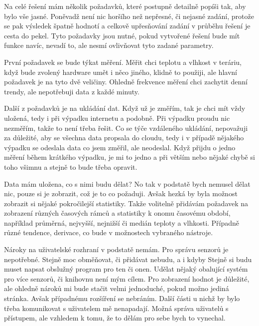 Na celé řešení mám několik požadavků, které postupně detailně popíši tak, aby bylo vše jasné. Poněvadž není nic horšího 
než nepřesné, či nejasné zadání, protože se pak výsledek špatně hodnotí a celkově upřesňování zadání v průběhu řešení je 
cesta do pekel. Tyto požadavky jsou nutné, pokud vytvořené řešení bude mít funkce navíc, nevadí to, ale nesmí ovlivňovat 
tyto zadané parametry.

První požadavek se bude týkat měření. Měřit chci teplotu a vlhkost v teráriu, když bude zvolený hardware umět i něco 
jiného, klidně to použiji, ale hlavní požadavek je na tyto dvě veličiny. Ohledně frekvence měření chci zachytit denní 
trendy, ale nepotřebuji data z každé minuty.

Další z požadavků je na ukládání dat. Když už je změřím, tak je chci mít vždy uložená, tedy i při výpadku internetu 
a podobně. Při výpadku proudu nic nezměřím, takže to není třeba řešit. Co se týče vzdáleného ukládání, nepovažuji za 
důležité, aby se všechna data propsala do cloudu, tedy i v případě nějakého výpadku se odeslala data co jsem změřil, ale 
neodeslal. Když přijdu o jedno měření během krátkého výpadku, je mi to jedno a při větším nebo nějaké chybě si toho 
všimnu a stejně to bude třeba opravit.

Data mám uložena, co s nimi budu dělat? No tak v podstatě bych nemusel dělat nic, pouze si je zobrazit, což je to co 
požaduji. Avšak hezká by byla možnost zobrazit si nějaké pokročilejší statistiky. Takže volitelně přidávám požadavek na 
zobrazení různých časových rámců a statistiky k onomu časovému období, například průměrná, nejvyšší, nejnižší či medián 
teploty a vlhkosti. Případně různé tendence, derivace, co bude v možnostech vybraného nástroje.

Nároky na uživatelské rozhraní v podstatě nemám. Pro správu senzorů je nepotřebné. Stejně moc obměňovat, či přidávat 
nebudu, a i kdyby Stejně si budu muset napsat obslužný program pro ten či onen. Udělat nějaký obalující systém pro více 
senzorů, či knihovnu není mým cílem. Pro zobrazení hodnot je důležité, ale ohledně nároků mi bude stačit velmi 
jednoduché, pokud možno jediná stránka. Avšak případnému rozšíření se nebráním. Další části u nichž by bylo třeba 
komunikovat s uživatelem mě nenapadají. Možná správa uživatelů s přístupem, ale vzhledem k tomu, že to dělám pro sebe 
bych to vynechal.

